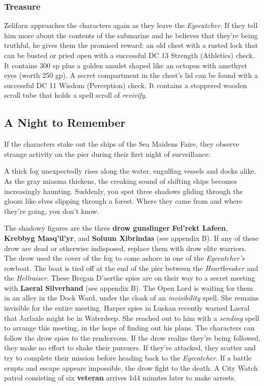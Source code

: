\documentclass[10pt,a4paper,twoside,twocolumn,openany,nodeprecatedcode]{dndbook}
\begin{document}
\subsubsection{Treasure}
Zelifarn approaches the characters again as they leave the \textit{Eyecatcher}. If they tell him more about the contents of the submarine and he believes that they're being truthful, he gives them the promised reward: an old chest with a rusted lock that can be busted or pried open with a successful DC 13 Strength (Athletics) check. It contains 300 sp plus a golden amulet shaped like an octopus with amethyst eyes (worth 250 gp).
A secret compartment in the chest's lid can be found with a successful DC 11 Wisdom (Perception) check. It contains a stoppered wooden scroll tube that holds a spell scroll of \textit{revivify}.
\subsection{A Night to Remember}
If the characters stake out the ships of the Sea Maidens Faire, they observe strange activity on the pier during their first night of surveillance:
\begin{DndReadAloud}{}
A thick fog unexpectedly rises along the water, engulfing vessels and docks alike. As the gray miasma thickens, the creaking sound of shifting ships becomes increasingly haunting. Suddenly, you spot three shadows gliding through the gloom like elves slipping through a forest. Where they came from and where they're going, you don't know.
\end{DndReadAloud}

The shadowy figures are the three \textbf{drow gunslinger} \textbf{Fel'rekt Lafeen}, \textbf{Krebbyg Masq'il'yr}, and \textbf{Soluun Xibrindas} (see appendix B). If any of these drow are dead or otherwise indisposed, replace them with drow elite warriors. The drow used the cover of the fog to come ashore in one of the \textit{Eyecatcher's} rowboat. The boat is tied off at the end of the pier between the \textit{Heartbreaker} and the \textit{Hellraiser}.
These Bregan D'aerthe spies are on their way to a secret meeting with \textbf{Laeral Silverhand} (see appendix B). The Open Lord is waiting for them in an alley in the Dock Ward, under the cloak of an \textit{invisibility} spell. She remains invisible for the entire meeting.
Harper spies in Luskan recently warned Laeral that Jarlaxle might be in Waterdeep. She reached out to him with a \textit{sending} spell to arrange this meeting, in the hope of finding out his plans. The characters can follow the drow spies to the rendezvous. If the drow realize they're being followed, they make no effort to shake their pursuers. If they're attacked, they scatter and try to complete their mission before heading back to the \textit{Eyecatcher}.
If a battle erupts and escape appears impossible, the drow fight to the death. A City Watch patrol consisting of six \textbf{veteran} arrives 1d4 minutes later to make arrests.
\end{document}
